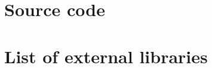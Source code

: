 \documentclass[Report.tex]{subfiles}
\begin{document}
\nocite{*} %
\printbibliography%
\clearpage

\begin{appendices}

\chapter{Source code}
  \label{chap:source}
  

\chapter{List of external libraries}
  \label{chap:libraries}
  
\end{appendices}
\end{document}
